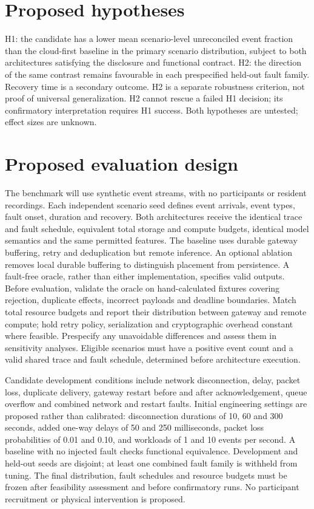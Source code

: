 \documentclass[11pt,a4paper]{article}
\begin{document}
\section{Proposed hypotheses}
H1: the candidate has a lower mean scenario-level unreconciled event fraction than the cloud-first baseline in the primary scenario distribution, subject to both architectures satisfying the disclosure and functional contract. H2: the direction of the same contrast remains favourable in each prespecified held-out fault family. Recovery time is a secondary outcome. H2 is a separate robustness criterion, not proof of universal generalization. H2 cannot rescue a failed H1 decision; its confirmatory interpretation requires H1 success. Both hypotheses are untested; effect sizes are unknown.

\section{Proposed evaluation design}
The benchmark will use synthetic event streams, with no participants or resident recordings. Each independent scenario seed defines event arrivals, event types, fault onset, duration and recovery. Both architectures receive the identical trace and fault schedule, equivalent total storage and compute budgets, identical model semantics and the same permitted features. The baseline uses durable gateway buffering, retry and deduplication but remote inference. An optional ablation removes local durable buffering to distinguish placement from persistence. A fault-free oracle, rather than either implementation, specifies valid outputs. Before evaluation, validate the oracle on hand-calculated fixtures covering rejection, duplicate effects, incorrect payloads and deadline boundaries. Match total resource budgets and report their distribution between gateway and remote compute; hold retry policy, serialization and cryptographic overhead constant where feasible. Prespecify any unavoidable differences and assess them in sensitivity analyses. Eligible scenarios must have a positive event count and a valid shared trace and fault schedule, determined before architecture execution.

Candidate development conditions include network disconnection, delay, packet loss, duplicate delivery, gateway restart before and after acknowledgement, queue overflow and combined network and restart faults. Initial engineering settings are proposed rather than calibrated: disconnection durations of 10, 60 and 300 seconds, added one-way delays of 50 and 250 milliseconds, packet loss probabilities of 0.01 and 0.10, and workloads of 1 and 10 events per second. A baseline with no injected fault checks functional equivalence. Development and held-out seeds are disjoint; at least one combined fault family is withheld from tuning. The final distribution, fault schedules and resource budgets must be frozen after feasibility assessment and before confirmatory runs. No participant recruitment or physical intervention is proposed.
\end{document}
